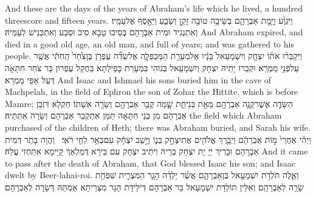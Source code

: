 {And these are the days of the years of Abraham’s life which he lived, a hundred threescore and fifteen years.}{}
{וַיִּגְוַ֨ע וַיָּ֧מׇת אַבְרָהָ֛ם בְּשֵׂיבָ֥ה טוֹבָ֖ה זָקֵ֣ן וְשָׂבֵ֑עַ וַיֵּאָ֖סֶף אֶל\maqqaf עַמָּֽיו׃}
{וְאִתְנְגִיד וּמִית אַבְרָהָם בְּסֵיבוּ טָבָא סִיב וּסְבַע וְאִתְכְּנֵישׁ לְעַמֵּיהּ׃}
{And Abraham expired, and died in a good old age, an old man, and full of years; and was gathered to his people.}{}
{וַיִּקְבְּר֨וּ אֹת֜וֹ יִצְחָ֤ק וְיִשְׁמָעֵאל֙ בָּנָ֔יו אֶל\maqqaf מְעָרַ֖ת הַמַּכְפֵּלָ֑ה אֶל\maqqaf שְׂדֵ֞ה עֶפְרֹ֤ן בֶּן\maqqaf צֹ֙חַר֙ הַֽחִתִּ֔י אֲשֶׁ֖ר עַל\maqqaf פְּנֵ֥י מַמְרֵֽא׃}
{וּקְבַרוּ יָתֵיהּ יִצְחָק וְיִשְׁמָעֵאל בְּנוֹהִי בִּמְעָרַת כָּפֵילְתָּא בַּחֲקַל עֶפְרוֹן בַּר צֹחַר חִתָּאָה דְּעַל אַפֵּי מַמְרֵא׃}
{And Isaac and Ishmael his sons buried him in the cave of Machpelah, in the field of Ephron the son of Zohar the Hittite, which is before Mamre;}{}
{הַשָּׂדֶ֛ה אֲשֶׁר\maqqaf קָנָ֥ה אַבְרָהָ֖ם מֵאֵ֣ת בְּנֵי\maqqaf חֵ֑ת שָׁ֛מָּה קֻבַּ֥ר אַבְרָהָ֖ם וְשָׂרָ֥ה אִשְׁתּֽוֹ׃}
{חַקְלָא דִּזְבַן אַבְרָהָם מִן בְּנֵי חִתָּאָה תַּמָּן אִתְקְבַר אַבְרָהָם וְשָׂרָה אִתְּתֵיהּ׃}
{the field which Abraham purchased of the children of Heth; there was Abraham buried, and Sarah his wife.}{}
{וַיְהִ֗י אַחֲרֵי֙ מ֣וֹת אַבְרָהָ֔ם וַיְבָ֥רֶךְ אֱלֹהִ֖ים אֶת\maqqaf יִצְחָ֣ק בְּנ֑וֹ וַיֵּ֣שֶׁב יִצְחָ֔ק עִם\maqqaf בְּאֵ֥ר לַחַ֖י רֹאִֽי׃ \petucha }
{וַהֲוָה בָּתַר דְּמִית אַבְרָהָם וּבָרֵיךְ יְיָ יָת יִצְחָק בְּרֵיהּ וִיתֵיב יִצְחָק עִם בֵּירָא דְּמַלְאַךְ קַיָּימָא אִתַּחְזִי עֲלַהּ׃}
{And it came to pass after the death of Abraham, that God blessed Isaac his son; and Isaac dwelt by Beer-lahai-roi.}{}
{וְאֵ֛לֶּה תֹּלְדֹ֥ת יִשְׁמָעֵ֖אל בֶּן\maqqaf אַבְרָהָ֑ם אֲשֶׁ֨ר יָלְדָ֜ה הָגָ֧ר הַמִּצְרִ֛ית שִׁפְחַ֥ת שָׂרָ֖ה לְאַבְרָהָֽם׃}
{וְאִלֵּין תּוֹלְדָת יִשְׁמָעֵאל בַּר אַבְרָהָם דִּילֵידַת הָגָר מִצְרֵיתָא אַמְתַּהּ דְּשָׂרָה לְאַבְרָהָם׃}
